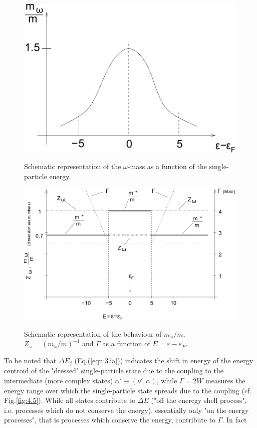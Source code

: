 \documentclass[a4paper,14pt]{book}
\begin{document}
\begin{figure}[h!]
\centerline {
{\includegraphics*[width=\textwidth]{figs_C4S/fig_4_3}}
}
\caption{Schematic representation of the $\omega$-mass as a function of the single-particle energy.}
\label{fig:4.3}
\end{figure}

\begin{figure}[h!]
\centerline {
{\includegraphics*[width=\textwidth]{figs_C4S/fig_4_4}}
}
\caption{Schematic representation of the behaviour of $m_{\omega}/m$, $Z_{\omega}=(m_{\omega}/m)^{-1}$ and $\Gamma$ as a function of $E = \varepsilon - \varepsilon_F$.}
\label{fig:4.4}
\end{figure}


To be noted that $\Delta E_j$ (Eq.(\ref{eqn:37a})) indicates the shift in energy of the energy centroid of the "dressed" single-particle state due to the coupling to the intermediate (more complex states) $\alpha' \equiv (\nu',\alpha)$, while $\Gamma = 2W$ measures the energy range over which the single-particle state spreads due to the coupling (cf. Fig.\ref{fig:4.5}). While all states contribute to $\Delta E$ ("off the eneregy shell process", i.e. processes which do not conserve the energy), essentially only "on the energy processes", that is processes which conserve the energy, contribute to $\Gamma$. In fact
\end{document}

